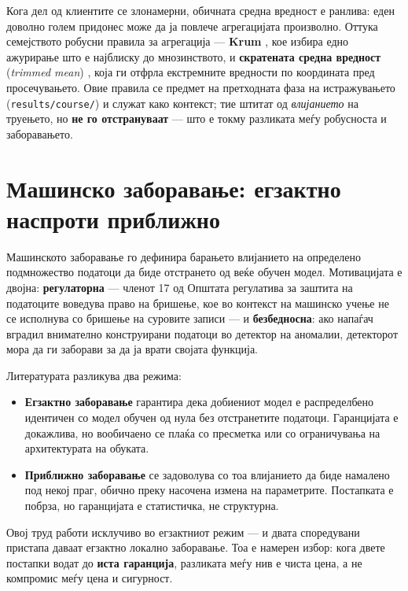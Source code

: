 Кога дел од клиентите се злонамерни, обичната средна вредност е ранлива: еден доволно
голем придонес може да ја повлече агрегацијата произволно. Оттука семејството робусни
правила за агрегација --- \textbf{Krum} \cite{blanchard2017krum}, кое избира едно ажурирање што е
најблиску до мнозинството, и \textbf{скратената средна вредност} (\emph{trimmed mean})
\cite{yin2018trimmedmean}, која ги отфрла екстремните вредности по координата пред
просечувањето. Овие правила се предмет на претходната фаза на истражувањето (\texttt{results/course/})
и служат како контекст; тие штитат од \emph{влијанието} на труењето, но \textbf{не го отстрануваат} --- што е токму разликата меѓу робусноста и заборавањето.

\section{Машинско заборавање: егзактно наспроти приближно}

Машинското заборавање \cite{cao2015unlearning, nguyen2022musurvey} го дефинира барањето
влијанието на определено подмножество податоци да биде отстрането од веќе обучен модел.
Мотивацијата е двојна: \textbf{регулаторна} --- членот 17 од Општата регулатива за заштита на
податоците \cite{gdpr2016} воведува право на бришење, кое во контекст на машинско учење не
се исполнува со бришење на суровите записи --- и \textbf{безбедносна}: ако напаѓач вградил
внимателно конструирани податоци во детектор на аномалии, детекторот мора да ги заборави за
да ја врати својата функција.

Литературата разликува два режима:

\begin{itemize}
  \item \textbf{Егзактно заборавање} гарантира дека добиениот модел е распределбено идентичен со модел обучен од нула без отстранетите податоци. Гаранцијата е докажлива, но вообичаено се плаќа со пресметка или со ограничувања на архитектурата на обуката.
  \item \textbf{Приближно заборавање} се задоволува со тоа влијанието да биде намалено под некој праг, обично преку насочена измена на параметрите. Постапката е побрза, но гаранцијата е статистичка, не структурна.
\end{itemize}

Овој труд работи исклучиво во егзактниот режим --- и двата споредувани пристапа даваат
егзактно локално заборавање. Тоа е намерен избор: кога двете постапки водат до \textbf{иста
гаранција}, разликата меѓу нив е чиста цена, а не компромис меѓу цена и сигурност.

